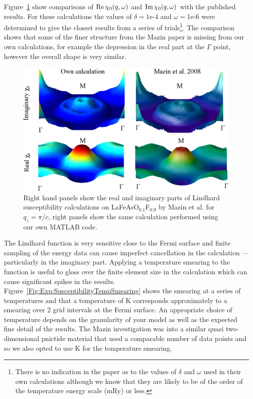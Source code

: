 Figure~\ref{Fig:Exp:MazinX0Comparison} show comparisons of $\operatorname{Re} \chi_0(q,\omega)$ and $\operatorname{Im} \chi_0(q,\omega)$ with the published results. For these calculations the values of $\delta=\textrm{1e-4}$ and $\omega=\textrm{1e-6}$ were determined to give the closest results from a series of trials\footnote{There is no indication in the paper as to the values of $\delta$ and $\omega$ used in their own calculations although we know that they are likely to be of the order of the temperature energy scale (\unit[1]{mRy}) or less.}. The comparison shows that some of the finer structure from the Mazin paper is missing from our own calculations, for example the depression in the real part at the $\Gamma$ point, however the overall shape is very similar.

\begin{figure}[htbp]
    \begin{center}
        \includegraphics[scale=0.9]{Chapter-dHvABaFe2P2/Figures/AngleDepMeasurements/SusceptibilityMazinComparison/SusceptibilityMazinComparison}
        \caption{Right hand panels show the real and imaginary parts of Lindhard susceptibility calculations on LaFeAsO$_{0.1}$F$_{0.9}$ by Mazin et al. for $q_z=\pi/c$, right panels show the same calculation performed using our own MATLAB code.}
        \label{Fig:Exp:MazinX0Comparison}
    \end{center}
\end{figure}


The Lindhard function is very sensitive close to the Fermi surface and finite sampling of the energy data  can cause imperfect cancellation in the calculation --- particularly in the imaginary part. Applying a temperature smearing to the function is useful to gloss over the finite element size in the calculation which can cause significant spikes in the results. Figure~\ref{Fig:Exp:SusceptibilityTempSmearing} shows the smearing at a series of temperatures and that a temperature of \unit[158]{K} corresponds approximately to a smearing over 2 grid intervals at the Fermi surface. An appropriate choice of temperature depends on the granularity of your model as well as the expected fine detail of the results. The Mazin investigation was into a similar quasi two-dimensional pnictide material that used a comparable number of data points and so we also opted to use \unit[158]{K} for the temperature smearing.

